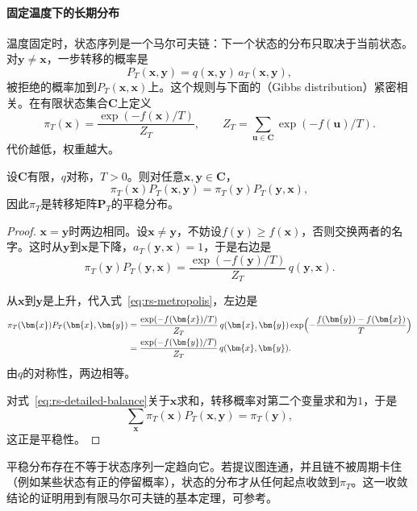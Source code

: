 \paragraph{固定温度下的长期分布}
温度固定时，状态序列是一个马尔可夫链：下一个状态的分布只取决于当前状态。对$\bm{y}\neq\bm{x}$，一步转移的概率是
\begin{equation}
 P_T(\bm{x},\bm{y})=q(\bm{x},\bm{y})\,a_T(\bm{x},\bm{y}),
 \label{eq:rs-sa-transition}
\end{equation}
被拒绝的概率加到$P_T(\bm{x},\bm{x})$上。这个规则与下面的（Gibbs distribution）紧密相关。在有限状态集合$\bm{C}$上定义
\begin{equation}
 \pi_T(\bm{x})=\frac{\exp(-f(\bm{x})/T)}{Z_T},\qquad
 Z_T=\sum_{\bm{u}\in\bm{C}}\exp(-f(\bm{u})/T).
 \label{eq:rs-gibbs}
\end{equation}
代价越低，权重越大。

\begin{theorem}[细致平衡]
\label{thm:rs-detailed-balance}
设$\bm{C}$有限，$q$对称，$T>0$。则对任意$\bm{x},\bm{y}\in\bm{C}$，
\begin{equation}
 \pi_T(\bm{x})P_T(\bm{x},\bm{y})=\pi_T(\bm{y})P_T(\bm{y},\bm{x}),
 \label{eq:rs-detailed-balance}
\end{equation}
因此$\pi_T$是转移矩阵$\bm{P}_T$的平稳分布。
\end{theorem}

\begin{proof}
$\bm{x}=\bm{y}$时两边相同。设$\bm{x}\neq\bm{y}$，不妨设$f(\bm{y})\geq f(\bm{x})$，否则交换两者的名字。这时从$\bm{y}$到$\bm{x}$是下降，$a_T(\bm{y},\bm{x})=1$，于是右边是
\[
 \pi_T(\bm{y})P_T(\bm{y},\bm{x})=\frac{\exp(-f(\bm{y})/T)}{Z_T}\,q(\bm{y},\bm{x}).
\]

从$\bm{x}$到$\bm{y}$是上升，代入式~\eqref{eq:rs-metropolis}，左边是
\[
 \begin{aligned}
 \pi_T(\bm{x})P_T(\bm{x},\bm{y})
 &=\frac{\exp(-f(\bm{x})/T)}{Z_T}\,q(\bm{x},\bm{y})\exp\Bigl(-\frac{f(\bm{y})-f(\bm{x})}{T}\Bigr)\\
 &=\frac{\exp(-f(\bm{y})/T)}{Z_T}\,q(\bm{x},\bm{y}).
 \end{aligned}
\]
由$q$的对称性，两边相等。

对式~\eqref{eq:rs-detailed-balance}关于$\bm{x}$求和，转移概率对第二个变量求和为$1$，于是
\[
 \sum_{\bm{x}}\pi_T(\bm{x})P_T(\bm{x},\bm{y})=\pi_T(\bm{y}),
\]
这正是平稳性。
\end{proof}

平稳分布存在不等于状态序列一定趋向它。若提议图连通，并且链不被周期卡住（例如某些状态有正的停留概率），状态的分布才从任何起点收敛到$\pi_T$。这一收敛结论的证明用到有限马尔可夫链的基本定理，可参考。

